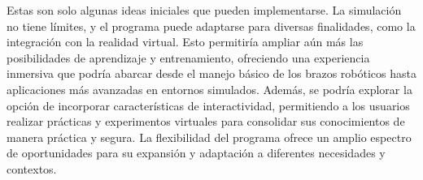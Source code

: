 Estas son solo algunas ideas iniciales que pueden implementarse. La simulación no tiene límites, y el programa puede adaptarse para diversas finalidades, como la integración con la realidad virtual. Esto permitiría ampliar aún más las posibilidades de aprendizaje y entrenamiento, ofreciendo una experiencia inmersiva que podría abarcar desde el manejo básico de los brazos robóticos hasta aplicaciones más avanzadas en entornos simulados. Además, se podría explorar la opción de incorporar características de interactividad, permitiendo a los usuarios realizar prácticas y experimentos virtuales para consolidar sus conocimientos de manera práctica y segura. La flexibilidad del programa ofrece un amplio espectro de oportunidades para su expansión y adaptación a diferentes necesidades y contextos.